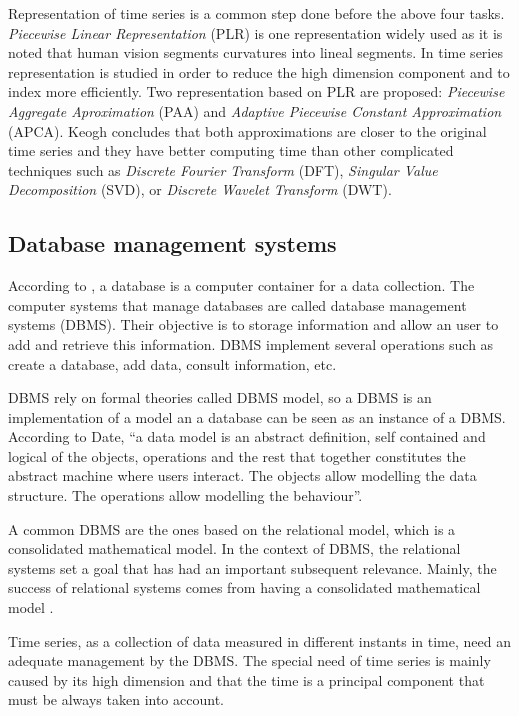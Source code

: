 Representation of time series is a common step done before the above four tasks.
\emph{Piecewise Linear Representation} (PLR) \parencite{keogh97,keogh98}  is one representation widely used as it is noted that human vision segments curvatures into lineal segments. In \textcite{keogh00,keogh01} time series representation is studied in order to reduce the high dimension component and to index more efficiently. Two representation based on PLR are proposed: \emph{Piecewise Aggregate Aproximation} (PAA) and \emph{Adaptive Piecewise Constant Approximation} (APCA). Keogh concludes that both approximations are closer to the original time series and they have better computing time than other complicated techniques such as \emph{Discrete Fourier Transform} (DFT), \emph{Singular Value Decomposition} (SVD), or \emph{Discrete Wavelet Transform} (DWT).



\subsection{Database management systems}

According to \textcite{date}, a database is a computer container for a data collection. The computer systems that manage databases are called database management systems (DBMS). Their objective is to storage information and allow an user to add and retrieve this information. DBMS implement several operations such as create a database, add data, consult information, etc.

DBMS rely on formal theories called DBMS model, so a DBMS is an implementation of a model an a database can be seen as an instance of a DBMS. According to Date, ``a data model is an abstract definition, self contained and logical of the objects, operations and the rest that together constitutes the abstract machine where users interact. The objects allow modelling the data structure. The operations allow modelling the behaviour''.

A common DBMS are the ones based on the relational model, which is a consolidated mathematical model. In the context of DBMS, the relational systems set a goal that has had an important subsequent relevance. Mainly, the success of relational systems comes from having a consolidated mathematical model \parencite{date}.

Time series, as a collection of data measured in different instants in time, need an adequate management by the DBMS. The special need of time series is mainly caused by its high dimension and that the time is a principal component that must be always taken into account. 
 

